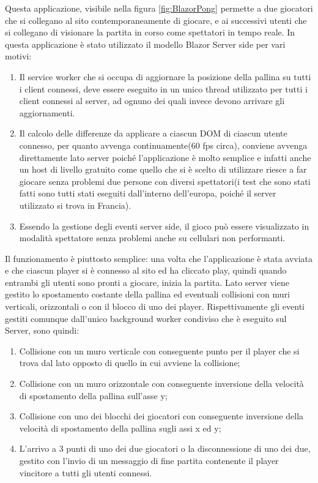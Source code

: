 Questa applicazione, visibile nella figura \ref{fig:BlazorPong} permette a due giocatori che si collegano al sito contemporaneamente di giocare, e ai successivi utenti che si collegano di visionare la partita in corso come spettatori in tempo reale.
In questa applicazione \`e stato utilizzato il modello Blazor Server side per vari motivi:
\begin{enumerate}
	\item Il service worker che si occupa di aggiornare la posizione della pallina su tutti i client connessi, deve essere eseguito in un unico thread utilizzato per tutti i client connessi al server, ad ognuno dei quali invece devono arrivare gli aggiornamenti.
	\item Il calcolo delle differenze da applicare a ciascun DOM di ciascun utente connesso, per quanto avvenga continuamente(60 fps circa), conviene avvenga direttamente lato server poich\'e l'applicazione \`e molto semplice e infatti anche un host di livello gratuito come quello che si \`e scelto di utilizzare riesce a far giocare senza problemi due persone con diversi spettatori(i test che sono stati fatti sono tutti stati eseguiti dall'interno dell'europa, poich\'e il server utilizzato si trova in Francia).
	\item Essendo la gestione degli eventi server side, il gioco pu\`o essere visualizzato in modalit\`a spettatore senza problemi anche su cellulari non performanti.	
\end{enumerate}

Il funzionamento \`e piuttosto semplice: una volta che l'applicazione \`e stata avviata e che ciascun player si \`e connesso al sito ed ha cliccato play, quindi quando entrambi gli utenti sono pronti a giocare, inizia la partita.
Lato server viene gestito lo spostamento costante della pallina ed eventuali collisioni con muri verticali, orizzontali o con il blocco di uno dei player.
Rispettivamente gli eventi gestiti comunque dall'unico background worker condiviso che \`e eseguito sul Server, sono quindi:
\begin{enumerate}
	\item Collisione con un muro verticale con conseguente punto per il player che si trova dal lato opposto di quello in cui avviene la collisione;
	\item Collisione con un muro orizzontale con conseguente inversione della velocit\`a di spostamento della pallina sull'asse y;
	\item Collisione con uno dei blocchi dei giocatori con conseguente inversione della velocit\`a di spostamento della pallina sugli assi x ed y;
	\item L'arrivo a 3 punti di uno dei due giocatori o la disconnessione di uno dei due, gestito con l'invio di un messaggio di fine partita contenente il player vincitore a tutti gli utenti connessi.
\end{enumerate}

